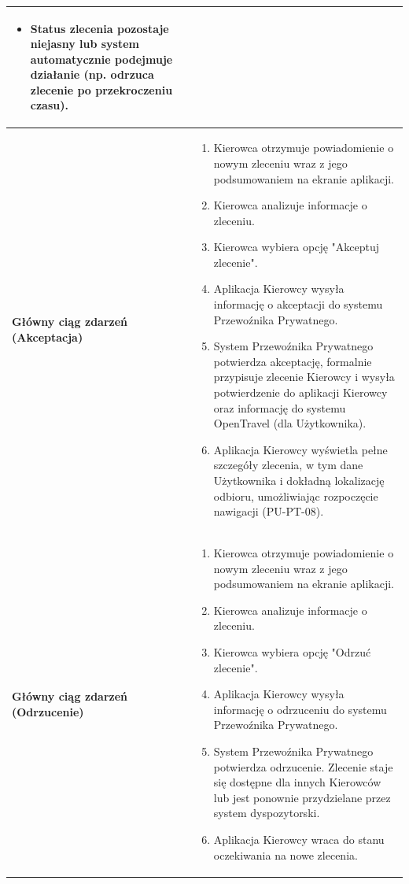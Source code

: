 \documentclass[a4paper,12pt]{article}
\begin{document}
\begin{longtable}{|p{\pierwszakolumnaszerokoscPUTPTAkceptacja}|p{\drugakolumnaszerokoscPUTPTAkceptacja}|}
\begin{itemize}
            \item Status zlecenia pozostaje niejasny lub system automatycznie podejmuje działanie (np. odrzuca zlecenie po przekroczeniu czasu).
        \end{itemize} \\
    \hline
    \textbf{Główny ciąg zdarzeń (Akceptacja)} &
        \begin{enumerate} \itemsep0pt \parskip0pt \parsep0pt
            \item Kierowca otrzymuje powiadomienie o nowym zleceniu wraz z jego podsumowaniem na ekranie aplikacji.
            \item Kierowca analizuje informacje o zleceniu.
            \item Kierowca wybiera opcję "Akceptuj zlecenie".
            \item Aplikacja Kierowcy wysyła informację o akceptacji do systemu Przewoźnika Prywatnego.
            \item System Przewoźnika Prywatnego potwierdza akceptację, formalnie przypisuje zlecenie Kierowcy i wysyła potwierdzenie do aplikacji Kierowcy oraz informację do systemu OpenTravel (dla Użytkownika).
            \item Aplikacja Kierowcy wyświetla pełne szczegóły zlecenia, w tym dane Użytkownika i dokładną lokalizację odbioru, umożliwiając rozpoczęcie nawigacji (PU-PT-08).
        \end{enumerate} \\
    \hline
    \textbf{Główny ciąg zdarzeń (Odrzucenie)} &
        \begin{enumerate} \itemsep0pt \parskip0pt \parsep0pt
            \item Kierowca otrzymuje powiadomienie o nowym zleceniu wraz z jego podsumowaniem na ekranie aplikacji.
            \item Kierowca analizuje informacje o zleceniu.
            \item Kierowca wybiera opcję "Odrzuć zlecenie".
            \item Aplikacja Kierowcy wysyła informację o odrzuceniu do systemu Przewoźnika Prywatnego.
            \item System Przewoźnika Prywatnego potwierdza odrzucenie. Zlecenie staje się dostępne dla innych Kierowców lub jest ponownie przydzielane przez system dyspozytorski.
            \item Aplikacja Kierowcy wraca do stanu oczekiwania na nowe zlecenia.
        \end{enumerate} \\

\end{longtable}
\end{document}
